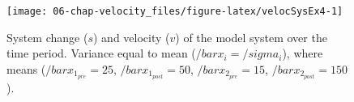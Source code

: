 \documentclass[]{article}
\begin{document}
\begin{figure}

{\centering \texttt{[image: 06-chap-velocity\_files/figure-latex/velocSysEx4-1]} 

}

\caption{System change ($s$) and velocity ($v$) of the model system over the time period. Variance equal to mean ($/bar{x_i}=/sigma_i$), where means ($/bar{x}_{1_{pre}}=25$, $/bar{x}_{1_{post}}=50$, $/bar{x}_{2_{pre}}=15$, $/bar{x}_{2_{post}}=150$).}\label{fig:velocSysEx4}
\end{figure}
\end{document}
